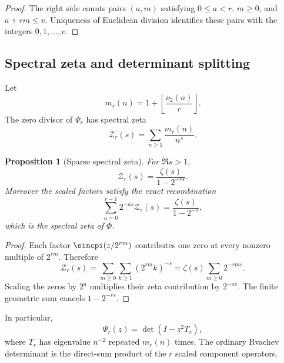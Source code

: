 \documentclass[11pt,oneside]{article}
\newtheorem{proposition}[theorem]{Proposition}
\theoremstyle{definition}
\newcommand{\vtwo}{\nu_2}
\begin{document}
\begin{proof}
The right side counts pairs $(a,m)$ satisfying
$0\le a<r$, $m\ge0$, and $a+rm\le v$.  Uniqueness of Euclidean division
identifies these pairs with the integers $0,1,\ldots,v$.
\end{proof}

\subsection{Spectral zeta and determinant splitting}

Let
\begin{equation}
 m_r(n)=1+\left\lfloor\frac{\vtwo(n)}r\right\rfloor.        \label{p2:eq:mr-def}
\end{equation}
The zero divisor of $\Psi_r$ has spectral zeta
\begin{equation}
 \mathcal Z_r(s)=\sum_{n\ge1}\frac{m_r(n)}{n^s}.            \label{p2:eq:Zr-def}
\end{equation}

\begin{proposition}[Sparse spectral zeta]
\label{p2:prop:sparse-spectral-zeta}
For $\Re s>1$,
\begin{equation}
 \boxed{\displaystyle
 \mathcal Z_r(s)=\frac{\zeta(s)}{1-2^{-rs}}.}               \label{p2:eq:sparse-spectral-zeta}
\end{equation}
Moreover the scaled factors satisfy the exact recombination
\begin{equation}
 \sum_{a=0}^{r-1}2^{-as}\mathcal Z_r(s)
 =\frac{\zeta(s)}{1-2^{-s}},                               \label{p2:eq:spectral-zeta-recombine}
\end{equation}
which is the spectral zeta of $\Phi$.
\end{proposition}

\begin{proof}
Each factor $\sincpi(z/2^{rm})$ contributes one zero at every nonzero multiple
of $2^{rm}$.  Therefore
\[
 \mathcal Z_r(s)
 =\sum_{m\ge0}\sum_{k\ge1}(2^{rm}k)^{-s}
 =\zeta(s)\sum_{m\ge0}2^{-rms}.
\]
Scaling the zeros by $2^a$ multiplies their zeta contribution by $2^{-as}$.
The finite geometric sum cancels $1-2^{-rs}$.
\end{proof}

In particular,
\begin{equation}
 \Psi_r(z)=\det(I-z^2T_r),                                  \label{p2:eq:Psi-determinant}
\end{equation}
where $T_r$ has eigenvalue $n^{-2}$ repeated $m_r(n)$ times.  The ordinary
Rvachev determinant is the direct-sum product of the $r$ scaled component
operators.
\end{document}

